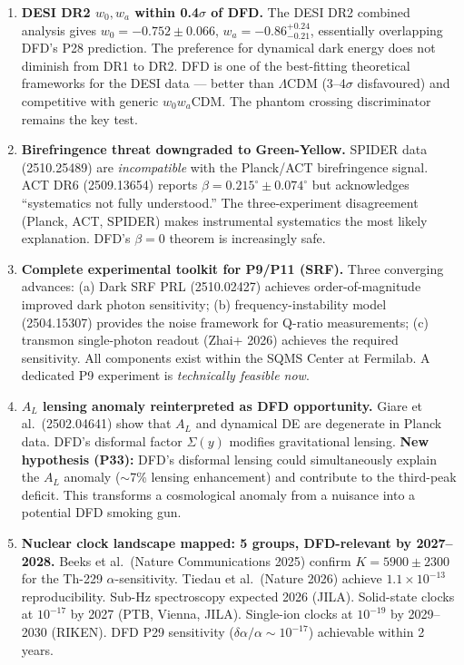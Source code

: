 \documentclass[11pt,a4paper]{article}
\begin{document}
\begin{enumerate}

\item \textbf{DESI DR2 $w_0, w_a$ within 0.4$\sigma$ of DFD.} The DESI DR2 combined analysis gives $w_0 = -0.752 \pm 0.066$, $w_a = -0.86^{+0.24}_{-0.21}$, essentially overlapping DFD's P28 prediction. The preference for dynamical dark energy does not diminish from DR1 to DR2. DFD is one of the best-fitting theoretical frameworks for the DESI data --- better than $\Lambda$CDM (3--4$\sigma$ disfavoured) and competitive with generic $w_0w_a$CDM. The phantom crossing discriminator remains the key test.

\item \textbf{Birefringence threat downgraded to Green-Yellow.} SPIDER data (2510.25489) are \emph{incompatible} with the Planck/ACT birefringence signal. ACT DR6 (2509.13654) reports $\beta = 0.215^\circ \pm 0.074^\circ$ but acknowledges ``systematics not fully understood.'' The three-experiment disagreement (Planck, ACT, SPIDER) makes instrumental systematics the most likely explanation. DFD's $\beta = 0$ theorem is increasingly safe.

\item \textbf{Complete experimental toolkit for P9/P11 (SRF).} Three converging advances: (a) Dark SRF PRL (2510.02427) achieves order-of-magnitude improved dark photon sensitivity; (b) frequency-instability model (2504.15307) provides the noise framework for Q-ratio measurements; (c) transmon single-photon readout (Zhai+ 2026) achieves the required sensitivity. All components exist within the SQMS Center at Fermilab. A dedicated P9 experiment is \emph{technically feasible now}.

\item \textbf{$A_L$ lensing anomaly reinterpreted as DFD opportunity.} Giare et al.\ (2502.04641) show that $A_L$ and dynamical DE are degenerate in Planck data. DFD's disformal factor $\Sigma(y)$ modifies gravitational lensing. \textbf{New hypothesis (P33):} DFD's disformal lensing could simultaneously explain the $A_L$ anomaly ($\sim$7\% lensing enhancement) and contribute to the third-peak deficit. This transforms a cosmological anomaly from a nuisance into a potential DFD smoking gun.

\item \textbf{Nuclear clock landscape mapped: 5 groups, DFD-relevant by 2027--2028.} Beeks et al.\ (Nature Communications 2025) confirm $K = 5900 \pm 2300$ for the Th-229 $\alpha$-sensitivity. Tiedau et al.\ (Nature 2026) achieve $1.1 \times 10^{-13}$ reproducibility. Sub-Hz spectroscopy expected 2026 (JILA). Solid-state clocks at $10^{-17}$ by 2027 (PTB, Vienna, JILA). Single-ion clocks at $10^{-19}$ by 2029--2030 (RIKEN). DFD P29 sensitivity ($\delta\alpha/\alpha \sim 10^{-17}$) achievable within 2 years.

\end{enumerate}
\end{document}

